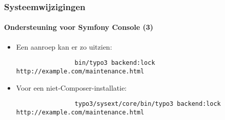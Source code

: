\begin{frame}[fragile]
	\frametitle{Systeemwijzigingen}
	\framesubtitle{Ondersteuning voor Symfony Console (3)}

	\lstset{basicstyle=\tiny\ttfamily}

	\begin{itemize}

		\item Een aanroep kan er zo uitzien:
			\begin{lstlisting}
				bin/typo3 backend:lock http://example.com/maintenance.html
			\end{lstlisting}

		\item Voor een niet-Composer-installatie:
			\begin{lstlisting}
				typo3/sysext/core/bin/typo3 backend:lock http://example.com/maintenance.html
			\end{lstlisting}

	\end{itemize}

\end{frame}


